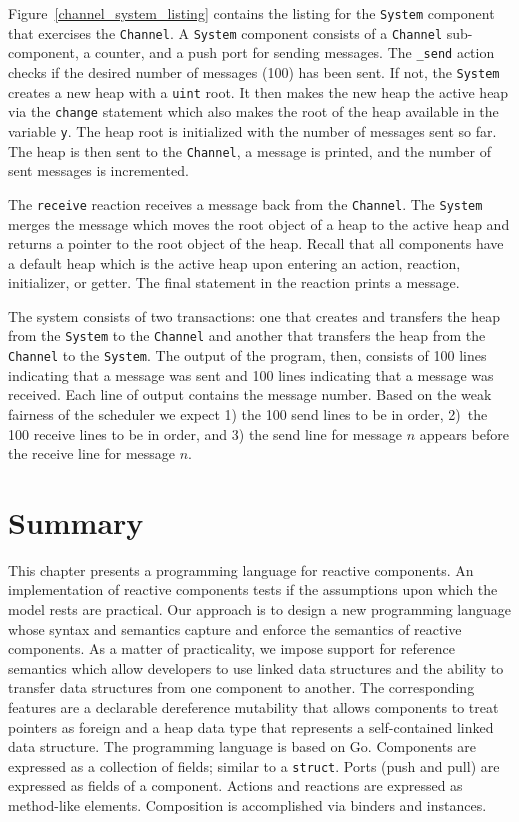 Figure~\ref{channel_system_listing} contains the listing for the \verb+System+ component that exercises the \verb+Channel+.
A \verb+System+ component consists of a \verb+Channel+ sub-component, a counter, and a push port for sending messages.
The \verb+_send+ action checks if the desired number of messages (100) has been sent.
If not, the \verb+System+ creates a new heap with a \verb+uint+ root.
It then makes the new heap the active heap via the \verb+change+ statement which also makes the root of the heap available in the variable \verb+y+.
The heap root is initialized with the number of messages sent so far.
The heap is then sent to the \verb+Channel+, a message is printed, and the number of sent messages is incremented.

The \verb+receive+ reaction receives a message back from the \verb+Channel+.
The \verb+System+ merges the message which moves the root object of a heap to the active heap and returns a pointer to the root object of the heap.
Recall that all components have a default heap which is the active heap upon entering an action, reaction, initializer, or getter.
The final statement in the reaction prints a message.

The system consists of two transactions:  one that creates and transfers the heap from the \verb+System+ to the \verb+Channel+ and another that transfers the heap from the \verb+Channel+ to the \verb+System+.
The output of the program, then, consists of 100 lines indicating that a message was sent and 100 lines indicating that a message was received.
Each line of output contains the message number.
Based on the weak fairness of the scheduler we expect 1) the 100 send lines to be in order, 2)~the 100 receive lines to be in order, and 3) the send line for message $n$ appears before the receive line for message $n$.

\section{Summary}

This chapter presents a programming language for reactive components.
An implementation of reactive components tests if the assumptions upon which the model rests are practical.
Our approach is to design a new programming language whose syntax and semantics  capture and enforce the semantics of reactive components.
As a matter of practicality, we impose support for reference semantics which allow developers to use linked data structures and the ability to transfer data structures from one component to another.
The corresponding features are a declarable dereference mutability that allows components to treat pointers as foreign and a heap data type that represents a self-contained linked data structure.
The programming language is based on Go.
Components are expressed as a collection of fields; similar to a \verb+struct+.
Ports (push and pull) are expressed as fields of a component.
Actions and reactions are expressed as method-like elements.
Composition is accomplished via binders and instances.

